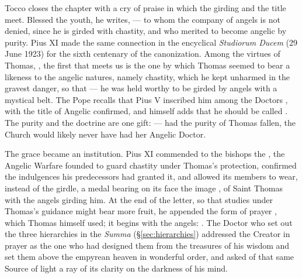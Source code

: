 Tocco closes the chapter with a cry of praise in which the girding and the
title meet. Blessed the youth, he writes,  ---
to whom the company of angels is not denied, since he is girded with
chastity, and who merited to become angelic by purity. Pius XI made the
same connection in the encyclical \emph{Studiorum Ducem} (29 June 1923) for
the sixth centenary of the canonization. Among the virtues of Thomas,
, the first that meets
us is the one by which Thomas seemed to bear a likeness to the angelic
natures, namely chastity, which he kept unharmed in the gravest danger, so
that  --- he was
held worthy to be girded by angels with a mystical belt. The Pope recalls
that Pius V inscribed him among the Doctors ,
with the title of Angelic confirmed, and himself adds that he should be
called . The purity and the doctrine are one gift:  --- had the purity of Thomas fallen,
the Church would likely never have had her Angelic Doctor.

The grace became an institution. Pius XI commended to the bishops the
, the Angelic Warfare founded to guard
chastity under Thomas's protection, confirmed the indulgences his
predecessors had granted it, and allowed its members to wear, instead of the
girdle, a medal bearing on its face the image , of Saint Thomas with the angels girding him. At the
end of the letter, so that studies under Thomas's guidance might bear more
fruit, he appended the form of prayer , which
Thomas himself used; it begins with the angels:
.
The Doctor who set out the three hierarchies in the \emph{Summa}
(\S\ref{sec:hierarchies}) addressed the Creator in prayer as the one who had
designed them from the treasures of his wisdom and set them above the
empyrean heaven in wonderful order, and asked of that same Source of light a
ray of its clarity on the darkness of his mind.

